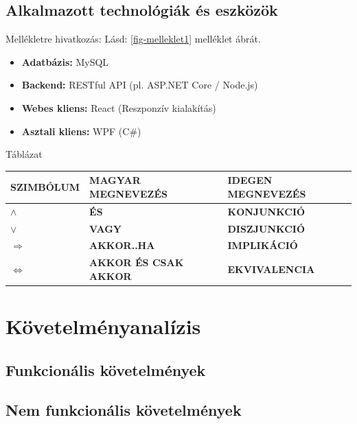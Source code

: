 \documentclass[colorlinks]{thesis-kando}
\theoremstyle{definition}
\theoremstyle{remark}
\begin{document}
\section{Alkalmazott technológiák és eszközök}
Mellékletre hivatkozás:
\newline
 Lásd: \ref{fig-melleklet1} melléklet ábrát. 
\begin{itemize}
	\item \textbf{Adatbázis:} MySQL
	\item \textbf{Backend:} RESTful API (pl. ASP.NET Core / Node.js)
	\item \textbf{Webes kliens:} React (Reszponzív kialakítás)
	\item \textbf{Asztali kliens:} WPF (C\#)
\end{itemize}
\newline
Táblázat
\newline
\begin{table}[ht]
	\centering
	\begin{tabular}{lll}
		\hline
		\multicolumn{1}{|l|}{\textbf{SZIMBÓLUM}} & \multicolumn{1}{l|}{\textbf{MAGYAR MEGNEVEZÉS}} & \multicolumn{1}{l|}{\textbf{IDEGEN MEGNEVEZÉS}} \\ \hline
		\multicolumn{1}{|l|}{\boldmath$\land$} & \multicolumn{1}{l|}{\textbf{ÉS}} & \multicolumn{1}{l|}{\textbf{KONJUNKCIÓ}} \\ \hline
		\multicolumn{1}{|l|}{\boldmath$\lor$} & \multicolumn{1}{l|}{\textbf{VAGY}} & \multicolumn{1}{l|}{\textbf{DISZJUNKCIÓ}} \\ \hline
		\multicolumn{1}{|l|}{\boldmath$\Rightarrow$} & \multicolumn{1}{l|}{\textbf{AKKOR..HA}} & \multicolumn{1}{l|}{\textbf{IMPLIKÁCIÓ}} \\ \hline
		\multicolumn{1}{|l|}{\boldmath$\Leftrightarrow$} & \multicolumn{1}{l|}{\textbf{AKKOR ÉS CSAK AKKOR}} & \multicolumn{1}{l|}{\textbf{EKVIVALENCIA}} \\ \hline
	\end{tabular}
\end{table}
\chapter{Követelményanalízis}
\section{Funkcionális követelmények}
\section{Nem funkcionális követelmények}
\end{document}
